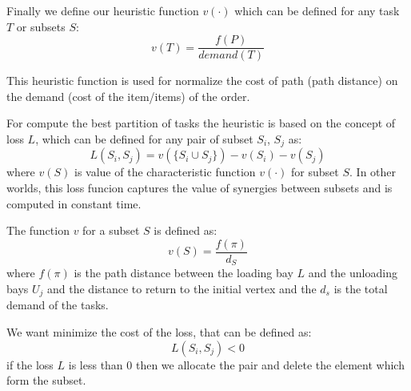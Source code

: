 Finally we define our heuristic function $v(\cdot)$ which
can be defined for any task $T$ or subsets $S$:
\[ v(T) = \frac{f(P)}{demand(T)}\]

This heuristic function is used for normalize the cost of path (path distance) 
on the demand (cost of the item/items) of the order. 

For compute the best partition of tasks the heuristic is based on the concept of loss $L$,
which can be defined for any pair of subset $S_i$, $S_j$ as:
\[L(S_i,S_j) = v(\{ S_i \cup S_j\}) - v(S_i) - v(S_j)\]
where $v(S)$ is value of the characteristic function $v(\cdot)$ for subset $S$.
In other worlds, this loss funcion captures the value of synergies between subsets
and is computed in constant time. 

The function $v$ for a subset $S$ is defined as:
\[ v(S) = \frac{f(\pi)}{d_S}\]
where $f(\pi)$ is the path distance between the loading bay $L$ and the unloading bays $U_j$ and the distance
to return to the initial vertex and the $d_s$ is the total demand of the tasks.

We want minimize the cost of the loss, that can be defined as:
\[L(S_i,S_j) < 0 \]
if the loss $L$ is less than 0 then we allocate the pair and delete the element which
form the subset.







